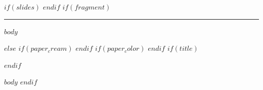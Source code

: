\documentclass[11pt,fontset=fandol]{ctexart}
\def\qhcapslides{0.62}
\newlength{\qfigmaxh}
\begin{document}
$if(slides)$
\fontsize{15pt}{22pt}\selectfont
\setlength{\parskip}{0.7em}
\setlength{\qfigmaxh}{\qhcapslides\textheight}
$endif$
$if(fragment)$
\begin{preview}
\noindent\rule{\linewidth}{0pt}\par
$body$
\end{preview}
$else$
$if(paper_cream)$
\pagecolor{qpapercream}
$endif$
$if(paper_color)$
\pagecolor{qpapercustom}
$endif$
$if(title)$
\maketitle
\thispagestyle{fancy}   %
$endif$

$body$
$endif$
\end{document}
